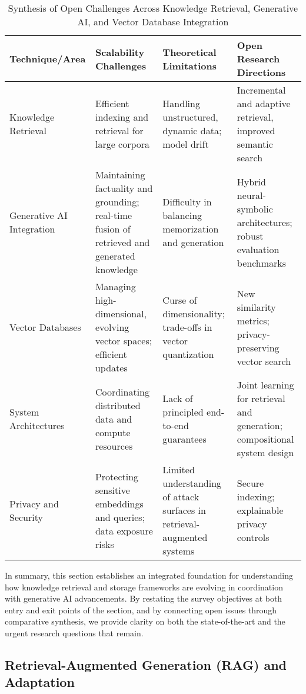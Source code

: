 \documentclass[sigconf]{acmart}
\begin{document}
\begin{table*}[htbp]
\centering
\caption{Synthesis of Open Challenges Across Knowledge Retrieval, Generative AI, and Vector Database Integration}
\label{tab:open_challenges_knowledge_retrieval}
\begin{adjustbox}{max width=\textwidth}
\begin{tabular}{@{}llll@{}}
\toprule
Technique/Area           & Scalability Challenges    & Theoretical Limitations        & Open Research Directions \\
\midrule
Knowledge Retrieval      & Efficient indexing and retrieval for large corpora & Handling unstructured, dynamic data; model drift & Incremental and adaptive retrieval, improved semantic search \\
Generative AI Integration & Maintaining factuality and grounding; real-time fusion of retrieved and generated knowledge & Difficulty in balancing memorization and generation & Hybrid neural-symbolic architectures; robust evaluation benchmarks \\
Vector Databases         & Managing high-dimensional, evolving vector spaces; efficient updates & Curse of dimensionality; trade-offs in vector quantization & New similarity metrics; privacy-preserving vector search \\
System Architectures     & Coordinating distributed data and compute resources & Lack of principled end-to-end guarantees & Joint learning for retrieval and generation; compositional system design\\
Privacy and Security     & Protecting sensitive embeddings and queries; data exposure risks & Limited understanding of attack surfaces in retrieval-augmented systems & Secure indexing; explainable privacy controls \\
\bottomrule
\end{tabular}
\end{adjustbox}
\end{table*}

In summary, this section establishes an integrated foundation for understanding how knowledge retrieval and storage frameworks are evolving in coordination with generative AI advancements. By restating the survey objectives at both entry and exit points of the section, and by connecting open issues through comparative synthesis, we provide clarity on both the state-of-the-art and the urgent research questions that remain.

\subsection{Retrieval-Augmented Generation (RAG) and Adaptation}
\end{document}
